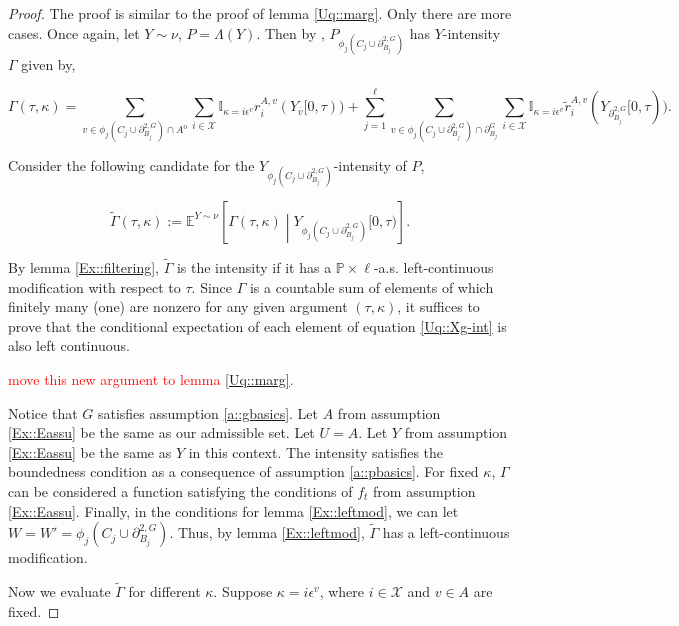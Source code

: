 \documentclass[12pt]{article}
\newcommand{\mb}{\mathbb}
\newcommand{\mc}{\mathcal}
\newcommand{\ov}{\overline}
\newcommand{\ep}{\epsilon}
\newcommand{\tr}{\textcolor{red}}
\newcommand{\ind}{\hspace{24pt}}
\newcommand{\pr}{\mb{P}}							%
\newcommand{\exmu}[2]{\mb{E}^{#1}\left[#2\right]}	%
\newcommand{\defeq}{:=}								%
\newcommand{\sta}{\mc{X}}							%
\newcommand{\gneigh}[2]{\partial^{#1}_{#2}}			%
\newcommand{\dgneigh}[2]{\partial^{2,#1}_{#2}}		%
\newcommand{\cl}[1]{\ov{#1}}						%
\newcommand{\Sm}{\ell}								%
\newcommand{\rate}{r}								%
\newcommand{\vind}[1]{_{#1}}						%
\newcommand{\tmi}[1]{#1}							%
\newcommand{\stpara}[1]{_{#1}}						%
\newcommand{\gvpara}[2]{^{#1,#2}}					%
\newcommand{\psize}{\ell}							%
\newcommand{\Xg}{Y}									%
\newcommand{\brate}{\alt{\rate}}					%
\newcommand{\inte}[1]{{#1}^\mathrm{o}}				%
\newcommand{\alt}[1]{\tilde{#1}}					%
\newcommand{\pmap}{\Lambda}							%
\newcommand{\rt}{\tau}								%
\renewcommand{\mark}{\kappa}						%
\newcommand{\ratee}{\Gamma}							%
\newcommand{\cratee}{\alt{\ratee}}					%
\newcommand{\rp}{P}									%
\newcommand{\mm}{\nu}								%
\newcommand{\ev}[1]{\ep^{#1}}						%
\begin{document}
\begin{proof}
The proof is similar to the proof of lemma \ref{Uq::marg}. Only there are more cases. Once again, let \(\Xg \sim \mm\), \(\rp = \pmap(\Xg)\). Then by \cite[Exercise 14.7.1]{DalVer08}, \(\rp\vind{\phi_j\left(C_j\cup\dgneigh{G}{B_j}\right)}\) has \(\Xg\)-intensity \(\ratee\) given by,

\begin{equation}
\ratee(\rt,\mark) = \sum_{v \in\phi_j\left(C_j\cup\dgneigh{G}{B_j}\right)\cap\inte{A}} \sum_{i \in \sta} \mb{I}_{\mark = i\ev{v}} \rate\gvpara{A}{v}\stpara{i}(\Xg\vind{\cl{v}}\tmi{[0,\rt)}) + \sum_{j = 1}^\psize\sum_{v \in \phi_j\left(C_j\cup\dgneigh{G}{B_j}\right)\cap\gneigh{G}{B_j}}\sum_{i\in \sta} \mb{I}_{\mark = i\ev{v}} \brate\gvpara{A}{v}\stpara{i}(\Xg\vind{\dgneigh{G}{B_j}}\tmi{[0,\rt)}).
\label{Uq::Xg-int2}
\end{equation}

Consider the following candidate for the \(\Xg\vind{\phi_j\left(C_j\cup\dgneigh{G}{B_j}\right)}\)-intensity of \(\rp\), 

\[\cratee(\rt,\mark) \defeq \exmu{\Xg \sim \mm}{\ratee(\rt,\mark)\middle|\Xg\vind{\phi_j\left(C_j\cup\dgneigh{G}{B_j}\right)}\tmi{[0,\rt)}}.\]

By lemma \ref{Ex::filtering}, \(\cratee\) is the intensity if it has a \(\pr\times\Sm\)-a.s. left-continuous modification with respect to \(\rt\). Since \(\ratee\) is a countable sum of elements of which finitely many (one) are nonzero for any given argument \((\rt,\mark)\), it suffices to prove that the conditional expectation of each element of equation \eqref{Uq::Xg-int} is also left continuous. 

\ind \tr{move this new argument to lemma \ref{Uq::marg}.}

\ind Notice that \(G\) satisfies assumption \ref{a::gbasics}. Let \(A\) from assumption \ref{Ex::Eassu} be the same as our admissible set. Let \(U = A\). Let \(\Xg\) from assumption \ref{Ex::Eassu} be the same as \(\Xg\) in this context. The intensity satisfies the boundedness condition as a consequence of assumption \ref{a::pbasics}. For fixed \(\kappa\), \(\ratee\) can be considered a function satisfying the conditions of \(f_t\) from assumption \ref{Ex::Eassu}. Finally, in the conditions for lemma \ref{Ex::leftmod}, we can let \(W = W' = \phi_j\left(C_j\cup\dgneigh{G}{B_j}\right)\). Thus, by lemma \ref{Ex::leftmod}, \(\cratee\) has a left-continuous modification.

\ind Now we evaluate \(\cratee\) for different \(\kappa\). Suppose \(\kappa = i\ev{v}\), where \(i \in \sta\) and \(v\in A\) are fixed.


\end{proof}
\end{document}
